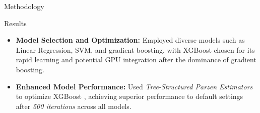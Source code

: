 \documentclass[final, 12pt]{beamer}
\newlength{\colwidth}
\newlength{\bigcolwidth}
\begin{document}
\begin{frame}[t]
\begin{columns}[t]
\begin{column}{\bigcolwidth}
\begin{block}{Methodology}
    \end{block}

    \begin{block}{Results}

        \begin{itemize}
            \item \textbf{Model Selection and Optimization:} Employed diverse models such as Linear Regression, SVM, and gradient boosting, with XGBoost chosen for its rapid learning and potential GPU integration after the dominance of gradient boosting.
            \item \textbf{Enhanced Model Performance:} Used \textit{Tree-Structured Parzen Estimators} \cite{bergstra2011algorithms} to optimize XGBoost \cite{guo2019xgboost}, achieving superior performance to default settings after \textit{500 iterations} across all models.
        \end{itemize}


\end{block}
\end{column}
\end{columns}
\end{frame}
\end{document}
